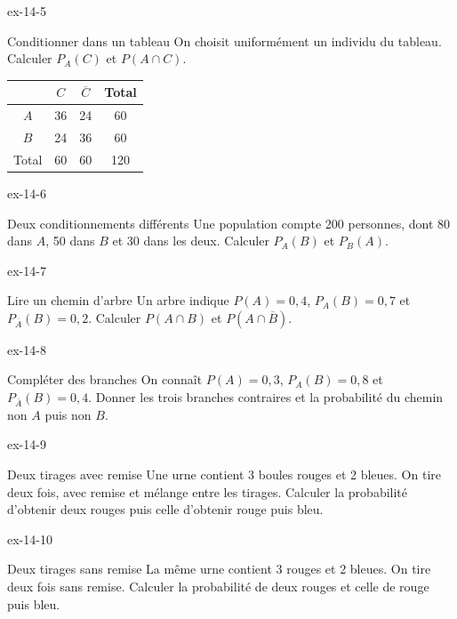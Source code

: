\begin{blocLivre}{ex-14-5}
\begin{exercice}[1]{Conditionner dans un tableau}
On choisit uniformément un individu du tableau. Calculer $P_A(C)$ et $P(A\cap C)$.\begin{center}\renewcommand{\arraystretch}{1.35}\begin{tabular}{c|ccc}\toprule
 & $C$ & $\overline C$ & Total\\\midrule
$A$ & 36 & 24 & 60\\
$B$ & 24 & 36 & 60\\
Total & 60 & 60 & 120\\
\bottomrule\end{tabular}\end{center}
\end{exercice}
\end{blocLivre}

\clearpage{}
\begin{blocLivre}{ex-14-6}
\begin{exercice}[2]{Deux conditionnements différents}
Une population compte 200 personnes, dont 80 dans $A$, 50 dans $B$ et 30 dans les deux. Calculer $P_A(B)$ et $P_B(A)$.
\end{exercice}
\end{blocLivre}
\begin{blocLivre}{ex-14-7}
\begin{exercice}[2]{Lire un chemin d’arbre}
Un arbre indique $P(A)=0{,}4$, $P_A(B)=0{,}7$ et $P_{\overline A}(B)=0{,}2$. Calculer $P(A\cap B)$ et $P(A\cap\overline B)$.
\label{fig-ex-14-7}
\end{exercice}
\end{blocLivre}
\begin{blocLivre}{ex-14-8}
\begin{exercice}[2]{Compléter des branches}
On connaît $P(A)=0{,}3$, $P_A(B)=0{,}8$ et $P_{\overline A}(B)=0{,}4$. Donner les trois branches contraires et la probabilité du chemin non $A$ puis non $B$.
\label{fig-ex-14-8}
\end{exercice}
\end{blocLivre}
\begin{blocLivre}{ex-14-9}
\begin{exercice}[2]{Deux tirages avec remise}
Une urne contient 3 boules rouges et 2 bleues. On tire deux fois, avec remise et mélange entre les tirages. Calculer la probabilité d’obtenir deux rouges puis celle d’obtenir rouge puis bleu.
\label{fig-ex-14-9}
\end{exercice}
\end{blocLivre}
\begin{blocLivre}{ex-14-10}
\begin{exercice}[2]{Deux tirages sans remise}
La même urne contient 3 rouges et 2 bleues. On tire deux fois sans remise. Calculer la probabilité de deux rouges et celle de rouge puis bleu.
\label{fig-ex-14-10}
\end{exercice}
\end{blocLivre}

